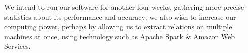 We intend to run our software for another four weeks, gathering more precise statistics about its performance and accuracy; we also wish to increase our computing power,
perhaps by allowing us to extract relations on multiple machines at once, using technology such as Apache Spark \& Amazon Web Services.
